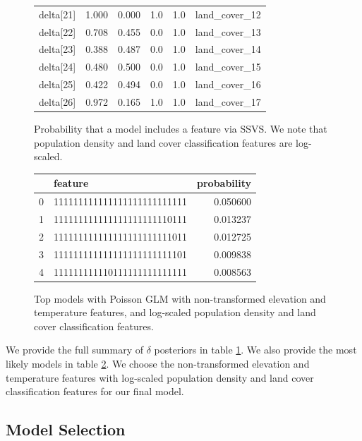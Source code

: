 \documentclass[notitlepage]{article}
\begin{document}
\begin{figure}[H]
\begin{tabular}{lrrrrl}
delta[21] &  1.000 &  0.000 &     1.0 &      1.0 &       land\_cover\_12 \\
delta[22] &  0.708 &  0.455 &     0.0 &      1.0 &       land\_cover\_13 \\
delta[23] &  0.388 &  0.487 &     0.0 &      1.0 &       land\_cover\_14 \\
delta[24] &  0.480 &  0.500 &     0.0 &      1.0 &       land\_cover\_15 \\
delta[25] &  0.422 &  0.494 &     0.0 &      1.0 &       land\_cover\_16 \\
delta[26] &  0.972 &  0.165 &     1.0 &      1.0 &       land\_cover\_17 \\
\bottomrule
\end{tabular}
\caption{Probability that a  model includes a feature via SSVS. We note that population density and land cover classification features are log-scaled.}
\label{table:delta_values}
\end{figure}

\begin{figure}[H]
\centering
\begin{tabular}{llr}
\toprule
{} &                      feature &  probability \\
\midrule
0 &  111111111111111111111111111 &     0.050600 \\
1 &  111111111111111111111110111 &     0.013237 \\
2 &  111111111111111111111111011 &     0.012725 \\
3 &  111111111111111111111111101 &     0.009838 \\
4 &  111111111110111111111111111 &     0.008563 \\
\bottomrule
\end{tabular}
\caption{Top models with Poisson GLM with non-transformed elevation and temperature features, and log-scaled population density and land cover classification features.}
\label{table:svss_model}
\end{figure}

We provide the full summary of $\delta$ posteriors in table \ref{table:delta_values}.
We also provide the most likely models in table \ref{table:svss_model}.
We choose the non-transformed elevation and temperature features with log-scaled population density and land cover classification features for our final model. 

\subsection{Model Selection}
\label{model_selection}
\end{document}
